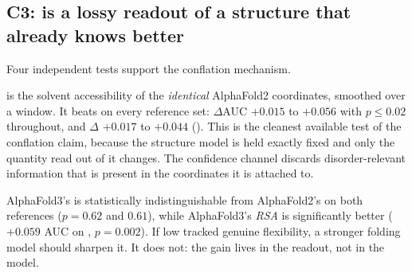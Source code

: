 \begin{table}[t]
    \centering
    \small
    \caption{\plddt at its calibrated operating point against the full panel, coverage-matched.
    \plddt is mid-pack, not the outlier the folk rule's critics or its users assume; and \afrsa,
    derived from the same coordinates at no extra cost, is within a point of the best dedicated
    method on \dpdb.}
    \label{tab:benchmark}
\end{table}

\subsection{C3: \texorpdfstring{\plddt}{pLDDT} is a lossy readout of a structure that already knows better}
\label{sec:c3}

Four independent tests support the conflation mechanism.

 \afrsa is the solvent accessibility of the
\emph{identical} AlphaFold2 coordinates, smoothed over a window. It beats \plddt on every
reference set: $\Delta$AUC $+0.015$ to $+0.056$ with $p \le 0.02$ throughout, and $\Delta$\bacc
$+0.017$ to $+0.044$ (). This is the cleanest available test of the
conflation claim, because the structure model is held exactly fixed and only the quantity read
out of it changes. The confidence channel discards disorder-relevant information that is present
in the coordinates it is attached to.

 AlphaFold3's \plddt is statistically
indistinguishable from AlphaFold2's on both \caidthree references ($p = 0.62$ and $0.61$), while
AlphaFold3's \emph{RSA} is significantly better ($+0.059$ AUC on \dnox, $p = 0.002$). If low
\plddt tracked genuine flexibility, a stronger folding model should sharpen it. It does not: the
gain lives in the readout, not in the model.


